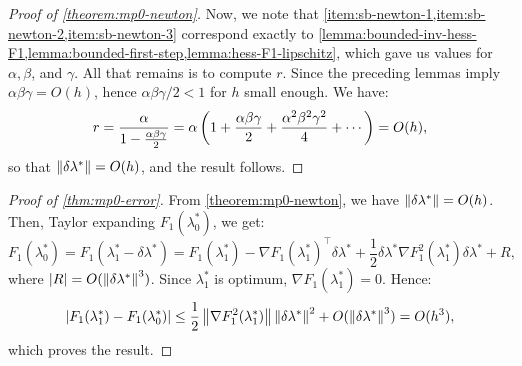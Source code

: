 \documentclass[eikonal.tex]{subfiles}
\begin{document}
\begin{proof}[Proof of \cref{theorem:mp0-newton}]
  Now, we note that
  \cref{item:sb-newton-1,item:sb-newton-2,item:sb-newton-3} correspond
  exactly to
  \cref{lemma:bounded-inv-hess-F1,lemma:bounded-first-step,lemma:hess-F1-lipschitz},
  which gave us values for $\alpha, \beta$, and $\gamma$. All that
  remains is to compute $r$. Since the preceding lemmas imply
  $\alpha\beta\gamma = O(h)$, hence $\alpha\beta\gamma/2 < 1$ for $h$
  small enough. We have:
  \begin{equation}
    r = \frac{\alpha}{1 - \frac{\alpha\beta\gamma}{2}} = \alpha \left(1 + \frac{\alpha\beta\gamma}{2} + \frac{\alpha^2\beta^2\gamma^2}{4} + \cdots\right) = O(h),
  \end{equation}
  so that $\left\|\delta\lambda^*\right\| = O(h)$, and the result follows.
\end{proof}

\begin{proof}[Proof of \cref{thm:mp0-error}]
  From \cref{theorem:mp0-newton}, we have
  $\left\|\delta\lambda^*\right\| = O(h)$. Then, Taylor expanding
  $F_1(\lambda_0^*)$, we get:
  \begin{equation*}
    F_1(\lambda_0^*)
    = F_1(\lambda_1^* - \delta \lambda^*) = F_1(\lambda_1^*) - \nabla F_1(\lambda_1^*)^\top \delta\lambda^* + \frac{1}{2} \delta\lambda^* \nabla F_1^2(\lambda_1^*) \delta\lambda^* + R,
  \end{equation*}
  where $\left|R\right| = O(\left\|\delta\lambda^*\right\|^3)$. Since $\lambda_1^*$
  is optimum, $\nabla F_1(\lambda_1^*) = 0$. Hence:
  \begin{equation*}
    \left|F_1(\lambda_1^*) - F_1(\lambda_0^*)\right| \leq \frac{1}{2} \left\|\nabla F_1^2(\lambda_1^*)\right\| \left\|\delta\lambda^*\right\|^2 + O(\left\|\delta\lambda^*\right\|^3) = O(h^3),
  \end{equation*}
  which proves the result.
\end{proof}
\end{document}
